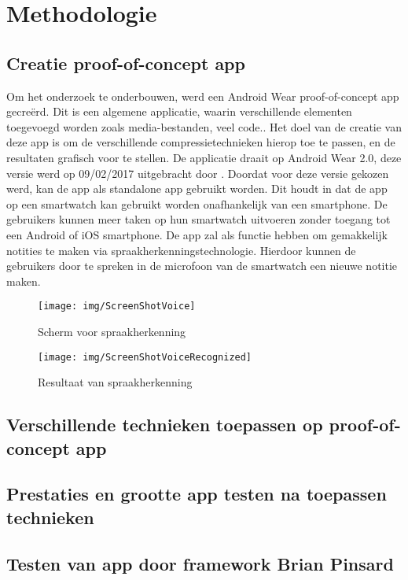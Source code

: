 
\chapter{Methodologie}
\label{ch:methodologie}


\section{Creatie proof-of-concept app}
\label{sec:proofofconcept}

Om het onderzoek te onderbouwen, werd een Android Wear proof-of-concept app gecreërd. Dit is een algemene applicatie, waarin verschillende elementen toegevoegd worden zoals media-bestanden, veel code.. Het doel van de creatie van deze app is om de verschillende compressietechnieken hierop toe te passen, en de resultaten grafisch voor te stellen. De applicatie draait op Android Wear 2.0, deze versie werd op 09/02/2017 uitgebracht door \textcite{Google} . Doordat voor deze versie gekozen werd, kan de app als standalone app gebruikt worden. Dit houdt in dat de app op een smartwatch kan gebruikt worden onafhankelijk van een smartphone. De gebruikers kunnen meer taken op hun smartwatch uitvoeren zonder toegang tot een Android of iOS smartphone. De app zal als functie hebben om gemakkelijk notities te maken via spraakherkenningstechnologie. Hierdoor kunnen de gebruikers door te spreken in de microfoon van de smartwatch een nieuwe notitie maken. 
\begin{figure}[h]
	\caption{Scherm voor spraakherkenning}
	\texttt{[image: img/ScreenShotVoice]}\\[.5cm]
	\centering
\end{figure}
\begin{figure}[h]
	\caption{Resultaat van spraakherkenning}
	\texttt{[image: img/ScreenShotVoiceRecognized]}\\[.5cm]
	\centering
\end{figure}
\section{Verschillende technieken toepassen op proof-of-concept app}
\label{sec:techniekentoepassen}


\section{Prestaties en grootte app testen na toepassen technieken}
\label{sec:prestatiesgrootteapp}

\section{Testen van app door framework Brian Pinsard}
\label{sec:apptesting}